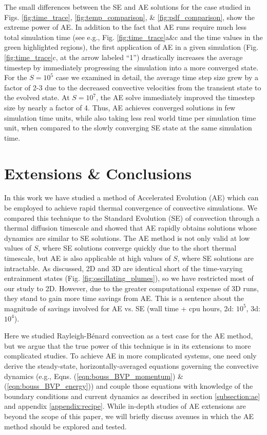 \documentclass[aps, pre, onecolumn, nofootinbib, notitlepage, groupedaddress, amsfonts, amssymb, amsmath, longbibliography]{revtex4-1}
\newcommand{\RB}{Rayleigh-B\'{e}nard }
\begin{document}
The small differences between the SE and AE solutions for the case studied in 
Figs. \ref{fig:time_trace}, \ref{fig:temp_comparison}, \& \ref{fig:pdf_comparison},
show the extreme power of AE.  In addition to the fact that AE runs require much
less total simulation time (see e.g., Fig. \ref{fig:time_trace}a\&c and the time
values in the green highlighted regions), the first application of AE in a given
simulation (Fig. \ref{fig:time_trace}c, at the arrow labeled ``1'') drastically
increases the average timestep by immediately progressing the simulation into
a more converged state. For the $S = 10^5$ case we examined in detail, the
average time step size grew by a factor of 2-3 due to the decreased convective
velocities from the transient state to the evolved state. 
At $S = 10^7$, the AE solve immediately improved the timestep size 
by nearly a factor of 4.
Thus, AE achieves converged solutions in few simulation time units,
while also taking less real world time per simulation time unit, when compared
to the slowly converging SE state at the same simulation time.




\section{Extensions \& Conclusions}
\label{sec:extensions}
In this work we have studied a method of Accelerated Evolution (AE) which can
be employed to achieve rapid thermal convergence of convective simulations.  We compared
this technique to the Standard Evolution (SE) of convection through a thermal diffusion timescale and
showed that AE rapidly obtains solutions whose dynamics are similar to SE solutions.
The AE method is not only valid at low values of $S$, where SE solutions
converge quickly due to the short thermal timescale, but AE is also applicable
at high values of $S$, where SE solutions are intractable.
As discussed, 2D and 3D are identical short of the time-varying entrainment states
(Fig. \ref{fig:oscillating_plumes}), so we have restricted most of our study to 2D.
However, due to the greater computational expense of 3D runs, they stand to gain more
time savings from AE. This is a sentence about the magnitude of savings involved for
AE vs. SE (wall time + cpu hours, 2d: $10^5$, 3d: $10^4$).

Here we studied \RB convection as a test case for the AE method, but we argue that
the true power of this technique is in its extensions to more complicated studies.
To achieve AE in more complicated systems, one need only derive 
the steady-state, horizontally-averaged equations governing
the convective dynamics
(e.g., Eqns. (\ref{eqn:bouss_BVP_momentum}) \& (\ref{eqn:bouss_BVP_energy}))
and couple those equations with knowledge of the boundary conditions
and current dynamics as described in
section \ref{subsection:ae} and appendix \ref{appendix:recipe}.
While in-depth studies of AE extensions are beyond the 
scope of this paper, we will briefly discuss
avenues in which the AE method should be explored and tested.
\end{document}
